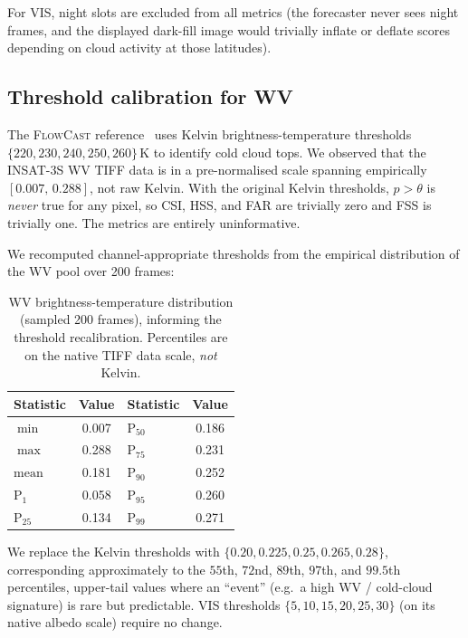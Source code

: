 \documentclass[11pt,a4paper]{article}
\begin{document}
For VIS, night slots are excluded from all metrics (the forecaster never
sees night frames, and the displayed dark-fill image would trivially
inflate or deflate scores depending on cloud activity at those latitudes).

\subsection{Threshold calibration for WV}
\label{sec:thresh}

The \textsc{FlowCast} reference~\citep{flowcast2026} uses Kelvin
brightness-temperature thresholds $\{220, 230, 240, 250, 260\}$\,K to
identify cold cloud tops. We observed that the {INSAT-3S} WV {TIFF} data
is in a pre-normalised scale spanning empirically $[0.007,\,0.288]$, not
raw Kelvin. With the original Kelvin thresholds, $p > \theta$ is
\emph{never} true for any pixel, so CSI, HSS, and FAR are trivially zero
and FSS is trivially one. The metrics are entirely uninformative.

We recomputed channel-appropriate thresholds from the empirical distribution
of the WV pool over 200 frames:

\begin{table}[h]
\centering\small
\caption{WV brightness-temperature distribution (sampled 200 frames),
informing the threshold recalibration. Percentiles are on the native
TIFF data scale, \emph{not} Kelvin.}
\label{tab:wv-distribution}
\begin{tabular}{lc|lc}
\toprule
Statistic & Value & Statistic & Value\\
\midrule
$\min$    & 0.007 & $\mathrm{P}_{50}$ & 0.186 \\
$\max$    & 0.288 & $\mathrm{P}_{75}$ & 0.231 \\
$\mathrm{mean}$ & 0.181 & $\mathrm{P}_{90}$ & 0.252 \\
$\mathrm{P}_{1}$  & 0.058 & $\mathrm{P}_{95}$ & 0.260 \\
$\mathrm{P}_{25}$ & 0.134 & $\mathrm{P}_{99}$ & 0.271 \\
\bottomrule
\end{tabular}
\end{table}

We replace the Kelvin thresholds with $\{0.20, 0.225, 0.25, 0.265, 0.28\}$,
corresponding approximately to the $55$th, $72$nd, $89$th, $97$th, and
$99.5$th percentiles, upper-tail values where an ``event'' (e.g.\ a high
WV / cold-cloud signature) is rare but predictable. VIS thresholds
$\{5,10,15,20,25,30\}$ (on its native albedo scale) require no change.
\end{document}
